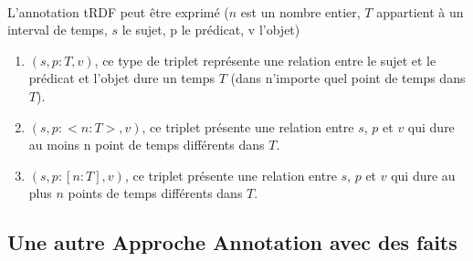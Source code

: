 \paragraph{}
L’annotation tRDF peut être exprimé ($n$ est un nombre entier, $T$ appartient à un interval de temps, $s$ le sujet, p le prédicat, v l'objet)
\begin{enumerate}
\item $(s, p : {T}, v)$, ce type de triplet représente une relation entre le sujet et le prédicat et l'objet dure un temps $T$ (dans n'importe quel point de temps dans $T$).
\item $(s, p : <n : T>, v)$, ce triplet présente une relation entre $s$, $p$ et $v$ qui dure au moins n point de temps différents dans $T$.
\item $(s, p : [n : T ], v)$, ce triplet présente une relation entre $s$, $p$ et $v$ qui dure au plus $n$ points de temps différents dans $T$. 
\end{enumerate}
\subsection*{Une autre Approche Annotation avec des faits}
